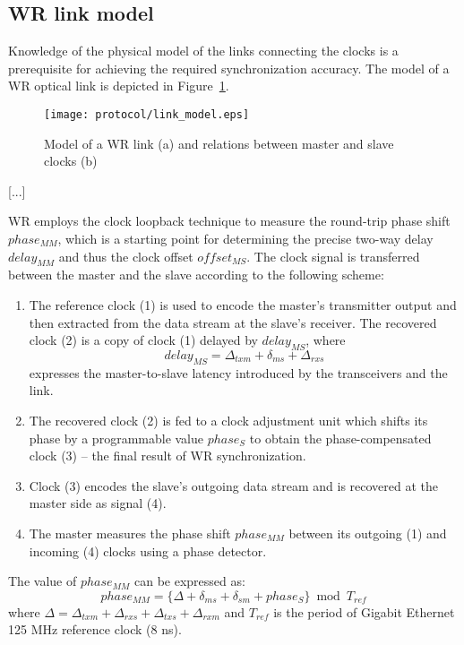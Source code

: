  \def\us{\char`\_}


\subsection{WR link model}
\label{s:link_model}

Knowledge of the physical model of the links connecting the clocks is a
prerequisite for achieving the required synchronization accuracy. The model
of a WR optical link is depicted in Figure~\ref{fig:link_model}.
\begin{figure}[ht!]
  \centering
  \texttt{[image: protocol/link\_model.eps]}
  \caption{Model of a WR link (a) and relations between master and slave
  clocks (b)}
  \label{fig:link_model}
\end{figure}
[...]

WR employs the clock loopback technique to measure the round-trip phase shift
$phase_{MM}$, which is a starting point for determining the precise two-way
delay $delay_{MM}$ and thus the clock offset $offset_{MS}$. The clock signal is
transferred between the master and the slave according to the following scheme:
\begin{enumerate}
\item The reference clock (1) is used to encode the master's transmitter
output and then extracted from the data stream at the slave's receiver. The
recovered clock (2) is a copy of clock (1) delayed by $delay_{MS}$, where
\begin{equation}
    \label{eq:delayms2}
    delay_{MS} = \Delta_{txm} + \delta_{ms} + \Delta_{rxs}
\end{equation}
expresses the master-to-slave latency introduced by the transceivers and
the link.
\item The recovered clock (2) is fed to a clock adjustment unit which shifts
its phase by a programmable value $phase_{S}$ to obtain the phase-compensated
clock (3) -- the final result of WR synchronization.
\item Clock (3) encodes the slave's outgoing data stream and is recovered
at the master side as signal (4).
\item The master measures the phase shift $phase_{MM}$ between its outgoing
(1) and incoming (4) clocks using a phase detector.
\end{enumerate}
The value of $phase_{MM}$ can be expressed as:
\begin{equation}
    \label{eq:phasemm}
    phase_{MM} = \{\Delta + \delta_{ms} + \delta_{sm} + phase_{S}\} \bmod
    T_{ref}
\end{equation}
where $\Delta = \Delta_{txm} + \Delta_{rxs} + \Delta_{txs} + \Delta_{rxm}$
and $T_{ref}$ is the period of Gigabit Ethernet 125 MHz reference clock (8 ns).

